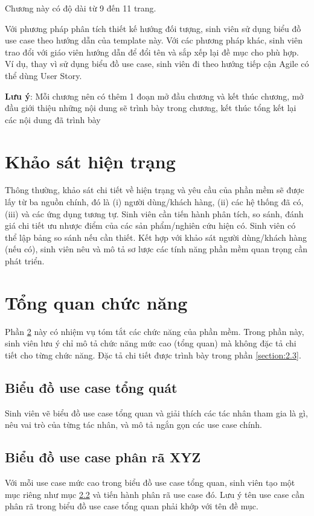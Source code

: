 \documentclass[../LuanVan.tex]{subfiles}
\begin{document}
Chương này có độ dài từ 9 đến 11 trang.

Với phương pháp phân tích thiết kế hướng đối tượng, sinh viên sử dụng biểu đồ use case theo hướng dẫn của template này. Với các phương pháp khác, sinh viên trao đổi với giáo viên hướng dẫn để đổi tên và sắp xếp lại đề mục cho phù hợp. Ví dụ, thay vì sử dụng biểu đồ use case, sinh viên đi theo hướng tiếp cận Agile có thể dùng User Story.


\textbf{Lưu ý}: Mỗi chương nên có thêm 1 đoạn mở đầu chương và kết thúc chương, mở đầu giới thiệu những nội dung sẽ trình bày trong chương, kết thúc tổng kết lại các nội dung đã trình bày

\section{Khảo sát hiện trạng}
\label{section:2.1}
Thông thường, khảo sát chi tiết về hiện trạng và yêu cầu của phần mềm sẽ được lấy từ ba nguồn chính, đó là (i) người dùng/khách hàng, (ii) các hệ thống đã có, (iii) và các ứng dụng tương tự.
Sinh viên cần tiến hành phân tích, so sánh, đánh giá chi tiết ưu nhược điểm của các sản phẩm/nghiên cứu hiện có. Sinh viên có thể lập bảng so sánh nếu cần thiết. Kết hợp với khảo sát người dùng/khách hàng (nếu có), sinh viên nêu và mô tả sơ lược các tính năng phần mềm quan trọng cần phát triển.

\section{Tổng quan chức năng}
\label{section:2.2}
Phần \ref{section:2.2} này có nhiệm vụ tóm tắt các chức năng của phần mềm. Trong phần này, sinh viên lưu ý chỉ mô tả chức năng mức cao (tổng quan) mà không đặc tả chi tiết cho từng chức năng. Đặc tả chi tiết được trình bày trong phần \ref{section:2.3}.

\subsection{Biểu đồ use case tổng quát}
\label{subsection:2.2.1}
Sinh viên vẽ biểu đồ use case tổng quan và giải thích các tác nhân tham gia là gì, nêu vai trò của từng tác nhân, và mô tả ngắn gọn các use case chính.

\subsection{Biểu đồ use case phân rã XYZ}
\label{subsection:2.2.2}
Với mỗi use case mức cao trong biểu đồ use case tổng quan, sinh viên tạo một mục riêng như mục \ref{subsection:2.2.2} và tiến hành phân rã use case đó. Lưu ý tên use case cần phân rã trong biểu đồ use case tổng quan phải khớp với tên đề mục.
\end{document}
